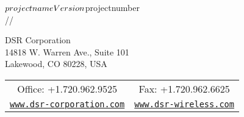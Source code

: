 \documentclass[oneside]{book}
\makeatletter
\newcommand{\+}{\discretionary{\mbox{\scriptsize$\hookleftarrow$}}{}{}}
\renewcommand{\@oddfoot}{Proprietary and confidential\hfill \thepage}
\renewcommand{\@evenfoot}{\thepage\hfill Proprietary and confidential}
\makeatother
\begin{document}
\hypersetup{pageanchor=false,
             bookmarks=true,
             bookmarksnumbered=true,
             pdfencoding=unicode
            }
\begin{titlepage}
\usebox{\dsrlogo}
\vspace*{7cm}
\begin{flushleft}
\huge $projectname\\
\normalsize Version $projectnumber\\
\number\month/\number\day/\number\year
\end{flushleft}
\vfill
\begin{center}
DSR Corporation\\
14818 W. Warren Ave., Suite 101\\
Lakewood, CO 80228, USA\\
\begin{tabular}{c|c}
Office: +1.720.962.9525 & Fax: +1.720.962.6625\\
\href{www.dsr-corporation.com}{\tt www.dsr-corporation.com} & \href{www.dsr-wireless.com}{\tt www.dsr-wireless.com}
\end{tabular}
\end{center}
\end{titlepage}
\tableofcontents
\hypersetup{pageanchor=true}
\makeatletter
\renewcommand{\@oddfoot}{Proprietary and confidential\hfill Page \thepage\ of \pageref{LastPage}}
\renewcommand{\@evenfoot}{Page \thepage\ of \pageref{LastPage}\hfill Proprietary and confidential}
\makeatother

\end{document}
